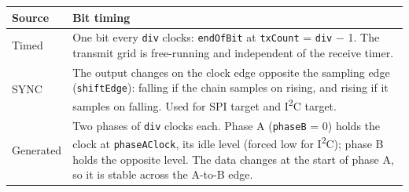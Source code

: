 \documentclass[11pt,a4paper]{article}
\newcommand{\sig}[1]{\texttt{#1}}
\begin{document}
\begin{center}
\begin{tabularx}{\linewidth}{@{}l L@{}}
\toprule
Source & Bit timing \\
\midrule
Timed & One bit every \sig{div} clocks: \sig{endOfBit} at \sig{txCount} = \sig{div} $-$ 1. The transmit grid is free-running and independent of the receive timer. \\
SYNC & The output changes on the clock edge opposite the sampling edge (\sig{shiftEdge}): falling if the chain samples on rising, and rising if it samples on falling. Used for SPI target and I\textsuperscript{2}C target. \\
Generated & Two phases of \sig{div} clocks each. Phase A (\sig{phaseB} = 0) holds the clock at \sig{phaseAClock}, its idle level (forced low for I\textsuperscript{2}C); phase B holds the opposite level. The data changes at the start of phase A, so it is stable across the A-to-B edge. \\
\bottomrule
\end{tabularx}
\end{center}
\end{document}
